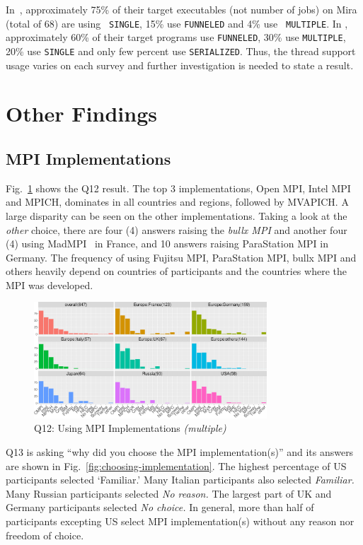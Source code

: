 \documentclass[preprint,5p,times]{elsarticle}
\def\myquote#1{{\it #1}}
\begin{document}
In~\cite{8665758}, approximately 75\% of their target
executables (not number of jobs) on Mira (total of 68) are using {\tt
  SINGLE}, 15\% use {\tt FUNNELED} and 4\% use {\tt
  MULTIPLE}. In \cite{10.1145/3295500.3356176}, approximately 60\% of
their target programs use {\tt FUNNELED}, 30\% use {\tt MULTIPLE}, 20\%
use {\tt SINGLE} and only few percent use {\tt SERIALIZED}. Thus, the
thread support usage varies on each survey and further investigation
is needed to state a result.

\section{Other Findings}

\subsection{MPI Implementations}

  Fig.~\ref{fig:using-implementations} shows the Q12 result. The top 3
  implementations, Open MPI, Intel MPI and MPICH, dominates in all
  countries and regions, followed by MVAPICH. A large disparity can be
  seen on the other implementations. Taking a
  look at the \myquote{other} choice, there are four (4) answers raising the
  \myquote{bullx MPI} and another four (4) using MadMPI~\cite{madmpi} in
  France, and 10
  answers raising ParaStation MPI in Germany. The frequency of using
  Fujitsu MPI, ParaStation MPI, bullx MPI and others heavily depend on
  countries of participants and the countries where the MPI was
  developed.

  \begin{figure}[htb]
    \begin{center}
      \includegraphics[width=8.7cm]{R-scripts/Q12.pdf}
      \caption{Q12: Using MPI Implementations {\it(multiple)}}
      \label{fig:using-implementations}
    \end{center}
  \end{figure}

  Q13 is asking ``why did you choose the MPI implementation(s)'' and its
  answers are shown in Fig.~\ref{fig:choosing-implementation}. The highest
  percentage of US participants selected `Familiar.' Many Italian
  participants also selected \myquote{Familiar.} Many Russian
  participants selected \myquote{No reason.} The largest part of UK and Germany
  participants selected \myquote{No choice.}
  In general, more than half of participants excepting US select MPI
  implementation(s) without any reason nor freedom of choice.
\end{document}
